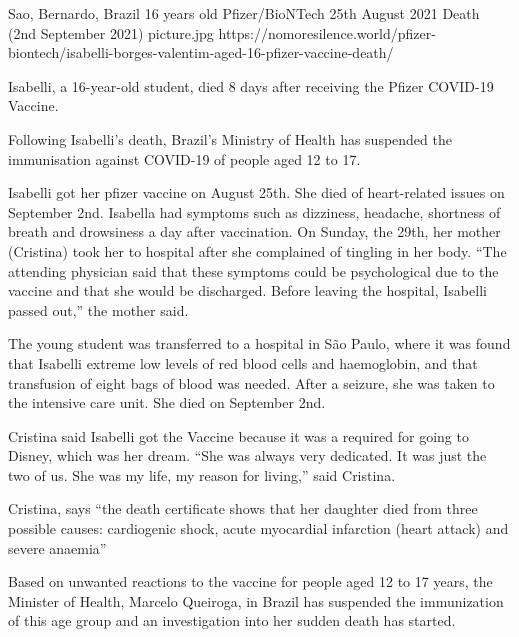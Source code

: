 {Sao, Bernardo, Brazil}
{16 years old}
{Pfizer/BioNTech}
{25th August 2021}
{Death (2nd September 2021)}
{picture.jpg}
{https://nomoresilence.world/pfizer-biontech/isabelli-borges-valentim-aged-16-pfizer-vaccine-death/}
{

Isabelli, a 16-year-old student, died 8 days after receiving the Pfizer COVID-19
Vaccine.

Following Isabelli’s death, Brazil’s Ministry of Health has suspended the
immunisation against COVID-19 of people aged 12 to 17.

Isabelli got her pfizer vaccine on August 25th. She died of heart-related issues
on September 2nd.  Isabella had symptoms such as dizziness, headache, shortness
of breath and drowsiness a day after vaccination. On Sunday, the 29th, her
mother (Cristina) took her to hospital after she complained of tingling in her
body. “The attending physician said that these symptoms could be psychological
due to the vaccine and that she would be discharged. Before leaving the
hospital, Isabelli passed out,” the mother said.

The young student was transferred to a hospital in São Paulo, where it was found
that Isabelli extreme low levels of red blood cells and haemoglobin, and that
transfusion of eight bags of blood was needed. After a seizure, she was taken to
the intensive care unit. She died on September 2nd.

Cristina said Isabelli got the Vaccine because it was a required for going to
Disney, which was her dream. “She was always very dedicated. It was just the two
of us. She was my life, my reason for living,” said Cristina.

Cristina, says “the death certificate shows that her daughter died from three
possible causes: cardiogenic shock, acute myocardial infarction (heart attack)
and severe anaemia”

Based on unwanted reactions to the vaccine for people aged 12 to 17 years, the
Minister of Health, Marcelo Queiroga, in Brazil has suspended the immunization
of this age group and an investigation into her sudden death has started.

}

